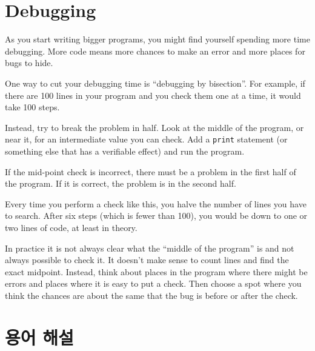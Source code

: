 \documentclass[10pt]{book}
\begin{document}
\section{Debugging}
\label{bisectbug}

As you start writing bigger programs, you might find yourself
spending more time debugging.  More code means more chances to
make an error and more places for bugs to hide.

One way to cut your debugging time is ``debugging by bisection''.
For example, if there are 100 lines in your program and you
check them one at a time, it would take 100 steps.

Instead, try to break the problem in half.  Look at the middle
of the program, or near it, for an intermediate value you
can check.  Add a {\tt print} statement (or something else
that has a verifiable effect) and run the program.

If the mid-point check is incorrect, there must be a problem in the
first half of the program.  If it is correct, the problem is
in the second half.

Every time you perform a check like this, you halve the number of
lines you have to search.  After six steps (which is fewer than 100),
you would be down to one or two lines of code, at least in theory.

In practice it is not always clear what
the ``middle of the program'' is and not always possible to
check it.  It doesn't make sense to count lines and find the
exact midpoint.  Instead, think about places
in the program where there might be errors and places where it
is easy to put a check.  Then choose a spot where you
think the chances are about the same that the bug is before
or after the check.




\section{용어 해설}
\end{document}
